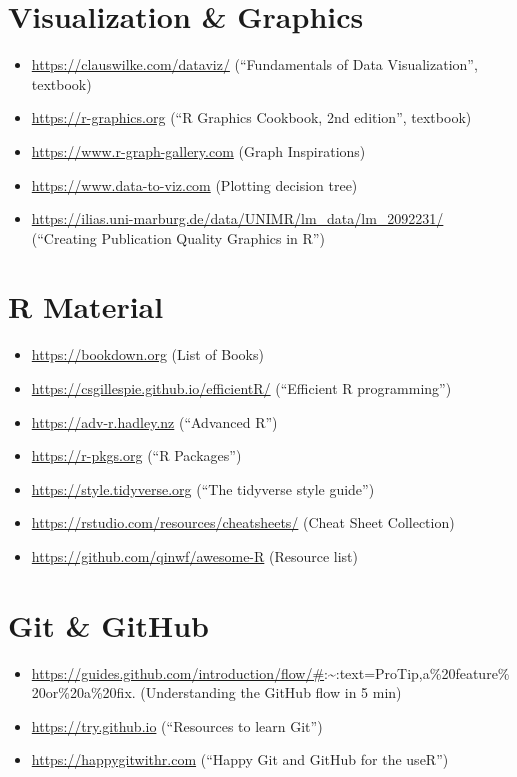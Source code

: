 \documentclass[
]{book}
\providecommand{\tightlist}{%
  \setlength{\itemsep}{0pt}\setlength{\parskip}{0pt}}
\begin{document}
\hypertarget{visualization-graphics}{%
\section{Visualization \& Graphics}\label{visualization-graphics}}

\begin{itemize}
\tightlist
\item
  \url{https://clauswilke.com/dataviz/} (``Fundamentals of Data Visualization'', textbook)
\item
  \url{https://r-graphics.org} (``R Graphics Cookbook, 2nd edition'', textbook)
\item
  \url{https://www.r-graph-gallery.com} (Graph Inspirations)
\item
  \url{https://www.data-to-viz.com} (Plotting decision tree)
\item
  \url{https://ilias.uni-marburg.de/data/UNIMR/lm_data/lm_2092231/} (``Creating Publication Quality Graphics in R'')
\end{itemize}

\hypertarget{r-material}{%
\section{R Material}\label{r-material}}

\begin{itemize}
\tightlist
\item
  \url{https://bookdown.org} (List of Books)
\item
  \url{https://csgillespie.github.io/efficientR/} (``Efficient R programming'')
\item
  \url{https://adv-r.hadley.nz} (``Advanced R'')
\item
  \url{https://r-pkgs.org} (``R Packages'')
\item
  \url{https://style.tidyverse.org} (``The tidyverse style guide'')
\item
  \url{https://rstudio.com/resources/cheatsheets/} (Cheat Sheet Collection)
\item
  \url{https://github.com/qinwf/awesome-R} (Resource list)
\end{itemize}

\hypertarget{git-github}{%
\section{Git \& GitHub}\label{git-github}}

\begin{itemize}
\tightlist
\item
  \url{https://guides.github.com/introduction/flow/\#}:\textasciitilde:text=ProTip,a\%20feature\%20or\%20a\%20fix. (Understanding the GitHub flow in 5 min)
\item
  \url{https://try.github.io} (``Resources to learn Git'')
\item
  \url{https://happygitwithr.com} (``Happy Git and GitHub for the useR'')
\end{itemize}
\end{document}
